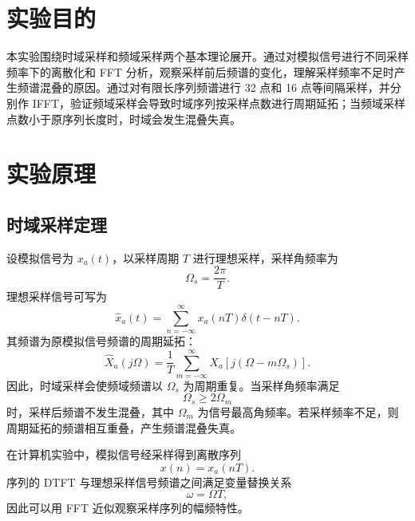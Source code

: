 \documentclass[bachelor,ktreport,openany,oneside,AutoFakeBold=true]{buaathesis}
\begin{document}
\tableofcontents
\cleardoublepage
{}
{}
\listoffigures
\cleardoublepage
{}
{}
\listoftables

\mainmatter
\pagestyle{mainmatter}

\chapter{实验目的}

本实验围绕时域采样和频域采样两个基本理论展开。通过对模拟信号进行不同采样频率下的离散化和 FFT 分析，观察采样前后频谱的变化，理解采样频率不足时产生频谱混叠的原因。通过对有限长序列频谱进行 32 点和 16 点等间隔采样，并分别作 IFFT，验证频域采样会导致时域序列按采样点数进行周期延拓；当频域采样点数小于原序列长度时，时域会发生混叠失真。

\chapter{实验原理}

\section{时域采样定理}

设模拟信号为 \(x_a(t)\)，以采样周期 \(T\) 进行理想采样，采样角频率为
\begin{equation}
\Omega_s=\frac{2\pi}{T}.
\end{equation}
理想采样信号可写为
\begin{equation}
\hat{x}_a(t)=\sum_{n=-\infty}^{\infty}x_a(nT)\delta(t-nT).
\end{equation}
其频谱为原模拟信号频谱的周期延拓：
\begin{equation}
\hat{X}_a(j\Omega)=\frac{1}{T}\sum_{m=-\infty}^{\infty}
X_a\left[j(\Omega-m\Omega_s)\right].
\end{equation}
因此，时域采样会使频域频谱以 \(\Omega_s\) 为周期重复。当采样角频率满足
\begin{equation}
\Omega_s \ge 2\Omega_m
\end{equation}
时，采样后频谱不发生混叠，其中 \(\Omega_m\) 为信号最高角频率。若采样频率不足，则周期延拓的频谱相互重叠，产生频谱混叠失真。

在计算机实验中，模拟信号经采样得到离散序列
\begin{equation}
x(n)=x_a(nT).
\end{equation}
序列的 DTFT 与理想采样信号频谱之间满足变量替换关系
\begin{equation}
\omega=\Omega T,
\end{equation}
因此可以用 FFT 近似观察采样序列的幅频特性。
\end{document}

